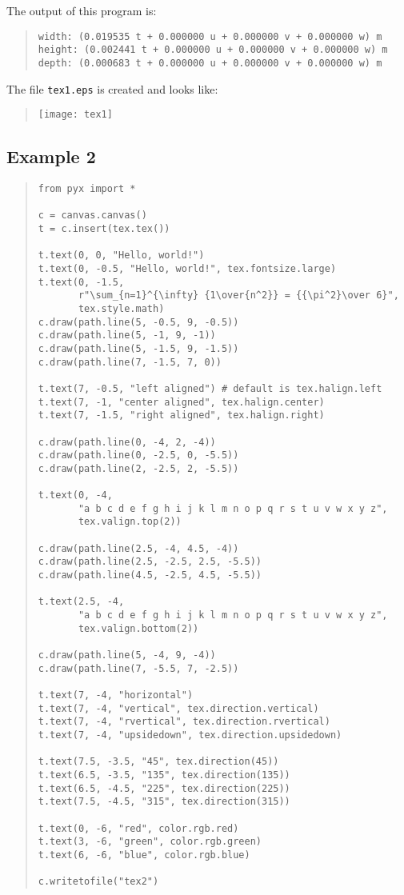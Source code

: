 The output of this program is:
\begin{quote}
\begin{verbatim}
width: (0.019535 t + 0.000000 u + 0.000000 v + 0.000000 w) m
height: (0.002441 t + 0.000000 u + 0.000000 v + 0.000000 w) m
depth: (0.000683 t + 0.000000 u + 0.000000 v + 0.000000 w) m
\end{verbatim}
\end{quote}

The file \verb|tex1.eps| is created and looks like:
\begin{quote}
\texttt{[image: tex1]}
\end{quote}

\subsection{Example 2}
\begin{quote}
\begin{verbatim}
from pyx import *

c = canvas.canvas()
t = c.insert(tex.tex())

t.text(0, 0, "Hello, world!")
t.text(0, -0.5, "Hello, world!", tex.fontsize.large)
t.text(0, -1.5,
       r"\sum_{n=1}^{\infty} {1\over{n^2}} = {{\pi^2}\over 6}",
       tex.style.math)
c.draw(path.line(5, -0.5, 9, -0.5))
c.draw(path.line(5, -1, 9, -1))
c.draw(path.line(5, -1.5, 9, -1.5))
c.draw(path.line(7, -1.5, 7, 0))

t.text(7, -0.5, "left aligned") # default is tex.halign.left
t.text(7, -1, "center aligned", tex.halign.center)
t.text(7, -1.5, "right aligned", tex.halign.right)

c.draw(path.line(0, -4, 2, -4))
c.draw(path.line(0, -2.5, 0, -5.5))
c.draw(path.line(2, -2.5, 2, -5.5))

t.text(0, -4,
       "a b c d e f g h i j k l m n o p q r s t u v w x y z",
       tex.valign.top(2))

c.draw(path.line(2.5, -4, 4.5, -4))
c.draw(path.line(2.5, -2.5, 2.5, -5.5))
c.draw(path.line(4.5, -2.5, 4.5, -5.5))

t.text(2.5, -4,
       "a b c d e f g h i j k l m n o p q r s t u v w x y z",
       tex.valign.bottom(2))

c.draw(path.line(5, -4, 9, -4))
c.draw(path.line(7, -5.5, 7, -2.5))

t.text(7, -4, "horizontal")
t.text(7, -4, "vertical", tex.direction.vertical)
t.text(7, -4, "rvertical", tex.direction.rvertical)
t.text(7, -4, "upsidedown", tex.direction.upsidedown)

t.text(7.5, -3.5, "45", tex.direction(45))
t.text(6.5, -3.5, "135", tex.direction(135))
t.text(6.5, -4.5, "225", tex.direction(225))
t.text(7.5, -4.5, "315", tex.direction(315))

t.text(0, -6, "red", color.rgb.red)
t.text(3, -6, "green", color.rgb.green)
t.text(6, -6, "blue", color.rgb.blue)

c.writetofile("tex2")
\end{verbatim}
\end{quote}

